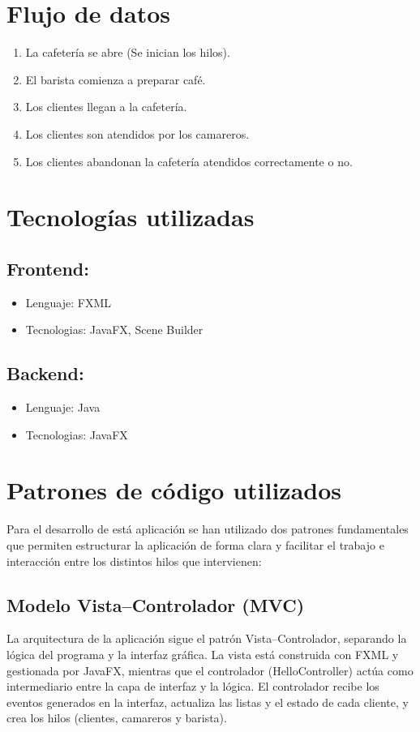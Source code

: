 \documentclass[a4paper,12pt]{article}
\begin{document}
    \section{Flujo de datos}
    \begin{enumerate}
        \item La cafetería se abre (Se inician los hilos).
        \item El barista comienza a preparar café.
        \item Los clientes llegan a la cafetería.
        \item Los clientes son atendidos por los camareros.
        \item Los clientes abandonan la cafetería atendidos correctamente o no.
    \end{enumerate}
    \section{Tecnologías utilizadas}
        \subsection{Frontend:}
            \begin{itemize}
                \item Lenguaje: FXML
                \item Tecnologias: JavaFX, Scene Builder
            \end{itemize}
        \subsection{Backend:}
            \begin{itemize}
                \item Lenguaje: Java
                \item Tecnologias: JavaFX
            \end{itemize}    
    \section{Patrones de código utilizados}
    Para el desarrollo de está aplicación se han utilizado dos patrones fundamentales que permiten estructurar la aplicación de forma clara y facilitar el trabajo e interacción entre los distintos hilos que intervienen:

    \subsection{Modelo Vista–Controlador (MVC)}
    La arquitectura de la aplicación sigue el patrón Vista–Controlador, separando la lógica del programa y la interfaz gráfica.  
    La vista está construida con FXML y gestionada por JavaFX, mientras que el controlador (HelloController) actúa como intermediario entre la capa de interfaz y la lógica.  
    El controlador recibe los eventos generados en la interfaz, actualiza las listas y el estado de cada cliente, y crea los hilos (clientes, camareros y barista).  
\end{document}

